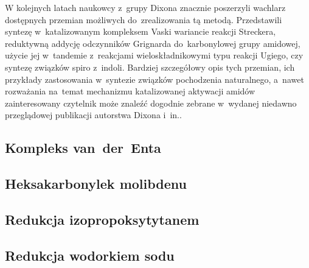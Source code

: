 W kolejnych latach naukowcy z~grupy Dixona znacznie poszerzyli wachlarz dostępnych przemian
  możliwych do~zrealizowania tą metodą.
Przedstawili syntezę  w~katalizowanym kompleksem Vaski wariancie reakcji
  Streckera,
  reduktywną addycję odczynników Grignarda do~karbonylowej grupy amidowej,
  użycie jej w~tandemie z~reakcjami wieloskładnikowymi typu reakcji Ugiego,
  czy syntezę związków spiro z~indoli.
Bardziej szczegółowy opis tych przemian, ich przykłady zastosowania w~syntezie związków pochodzenia
  naturalnego, a~nawet rozważania na~temat mechanizmu katalizowanej \vaska{} aktywacji amidów
  zainteresowany czytelnik może znaleźć dogodnie zebrane w~wydanej niedawno przeglądowej
  publikacji autorstwa Dixona i~in..

\subsection{Kompleks van~der~Enta}\label{literature:new:van-der-ent}
\subsection{Heksakarbonylek molibdenu}\label{literature:new:molydenium}
\subsection{Redukcja izopropoksytytanem}\label{literature:new:titanium}
\subsection{Redukcja wodorkiem sodu}\label{literature:new:sodium-hydride}
